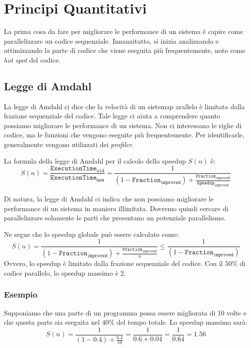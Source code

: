 \section{Principi Quantitativi}

La prima cosa da fare per migliorare le performance
di un sistema è capire come parallelizzare un codice
sequenziale. Innanzitutto, si inizia analizzando e
ottimizzando la parte di codice che viene eseguita più
frequentemente, noto come \textit{hot spot} del codice.
\subsection{Legge di Amdahl}

La legge di Amdahl ci dice che la velocità di un sistemap
arallelo è limitata dalla frazione sequenziale del codice.
Tale legge ci aiuta a comprendere quanto possiamo
migliorare le performance di un sistema. Non ci
interessano le righe di codice, ma le funzioni che
vengono eseguite più frequentemente. Per identificarle,
generalmente vengono utilizzati dei \textit{profiler}.

La formula della legge di Amdahl per il calcolo dello
speedup \(S(n)\) è:
\[
  S(n) = \frac{\texttt{ExecutionTime}_{\texttt{old}}}
  {\texttt{ExecutionTime}_{\texttt{new}}}
  = \frac{1}{(1-\texttt{Fraction}_{\texttt{improved}})
  + \frac{\texttt{Fraction}_{\texttt{improved}}}
  {\texttt{Speedup}_{\texttt{improved}}}}
\]

Di natura, la legge di Amdahl ci indica che non possiamo
migliorare le performance di un sistema in maniera
illimitata. Dovremo quindi cercare di parallelizzare
solamente le parti che presentano un potenziale
parallelismo.

Ne segue che lo speedup globale può essere calcolato come:
\[
  S(n) = \frac{1}{(1-\texttt{Fraction}_{\texttt{improved}})
  + \frac{\texttt{Fraction}_{\texttt{improved}}}{n}} \leq 
    \frac{1}{(1-\texttt{Fraction}_{\texttt{improved}})}
\]
Ovvero, lo speedup è limitato dalla frazione sequenziale
del codice. Con il \(50\%\) di codice parallelo,
lo speedup massimo è \(2\).

\subsubsection{Esempio}

Supponiamo che una parte di un programma possa essere
migliorata di 10 volte e che questa parte sia eseguita
nel \(40\%\) del tempo totale. Lo speedup massimo sarà:
\[
  S(n) = \frac{1}{(1-0.4) + \frac{0.4}{10}} =
  \frac{1}{0.6 + 0.04} = \frac{1}{0.64} = 1.56
\]

